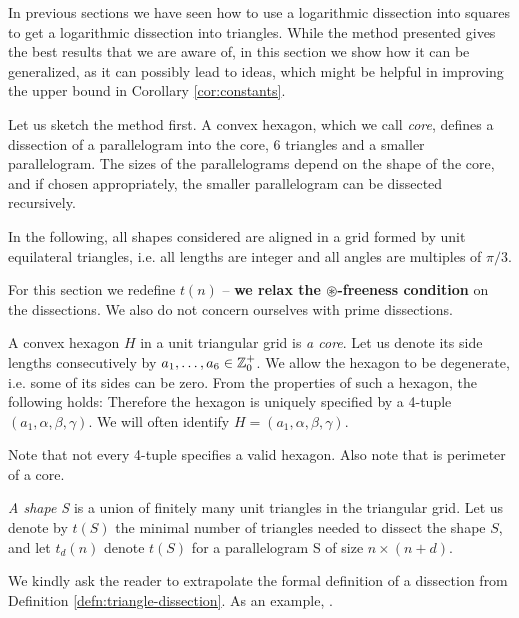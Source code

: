 In previous sections we have seen how to use a logarithmic dissection into squares to get a logarithmic dissection into triangles. While the method presented gives the best results that we are aware of, in this section we show how it can be generalized, as it can possibly lead to ideas, which might be helpful in improving the upper bound in Corollary \ref{cor:constants}.

Let us sketch the method first. A convex hexagon, which we call \emph{core}, defines a dissection of a parallelogram into the core, 6 triangles and a smaller parallelogram. The sizes of the parallelograms depend on the shape of the core, and if chosen appropriately, the smaller parallelogram can be dissected recursively.

In the following, all shapes considered are aligned in a grid formed by unit equilateral triangles, i.e. all lengths are integer and all angles are multiples of $\pi/3$.

For this section we redefine $t(n)$ -- \textbf{we relax the $\circledast$-freeness condition} on the dissections. We also do not concern ourselves with prime dissections.

\begin{defn}
A convex hexagon $H$ in a unit triangular grid is \emph{a core}. Let us denote its side lengths consecutively by $a_1,\dots,a_6 \in \mathbb Z_0^+$. We allow the hexagon to be degenerate, i.e. some of its sides can be zero. From the properties of such a hexagon, the following holds:
Therefore the hexagon is uniquely specified by a 4-tuple $(a_1, \alpha, \beta, \gamma)$. We will often identify $H = (a_1, \alpha, \beta, \gamma)$.
\end{defn}

Note that not every 4-tuple specifies a valid hexagon. Also note that
%
is perimeter of a core.

\begin{defn}
\emph{A shape S} is a union of finitely many unit triangles in the triangular grid. Let us denote by $t(S)$ the minimal number of triangles needed to dissect the shape $S$, and let $t_d(n)$ denote $t(S)$ for a parallelogram S of size $n \times (n+d)$.
\end{defn}

We kindly ask the reader to extrapolate the formal definition of a dissection from Definition \ref{defn:triangle-dissection}. As an example, .

